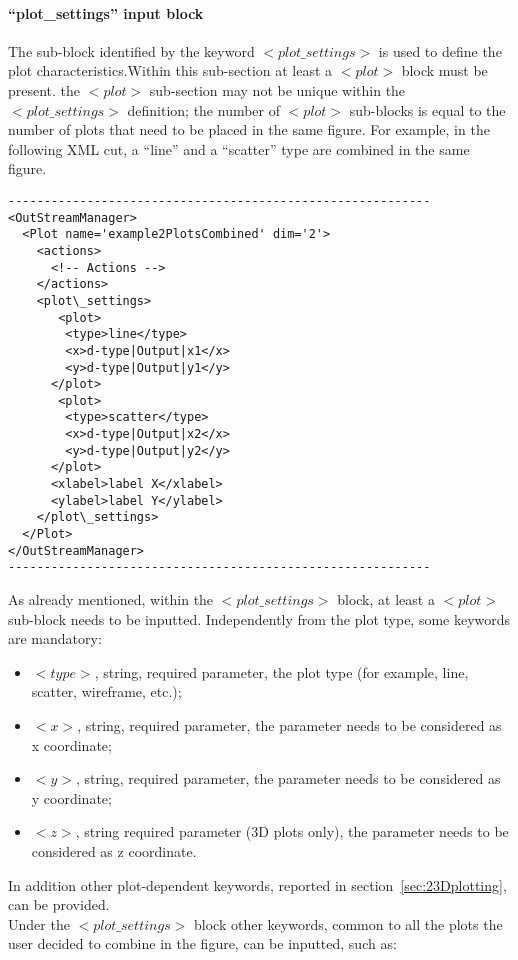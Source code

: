 \paragraph{``plot\_settings'' input block \label{sec:plotSettings}} 
The sub-block identified by the keyword $<plot\_settings>$ is used to define the plot characteristics.Within this sub-section at least a $<plot>$ block must be present. the $<plot>$ sub-section may not be unique within the $<plot\_settings>$  definition; the number of  $<plot>$ sub-blocks is equal to the number of plots that need to be placed in the same figure. For example, in the following XML cut, a ``line'' and a ``scatter'' type are combined in the same figure. 
\begin{lstlisting}[style=XML]
-----------------------------------------------------------
<OutStreamManager>
  <Plot name='example2PlotsCombined' dim='2'>
    <actions>
      <!-- Actions -->
    </actions>
    <plot\_settings>
       <plot>
        <type>line</type>
        <x>d-type|Output|x1</x>
        <y>d-type|Output|y1</y> 
      </plot>
       <plot>
        <type>scatter</type>
        <x>d-type|Output|x2</x>
        <y>d-type|Output|y2</y> 
      </plot>
      <xlabel>label X</xlabel>
      <ylabel>label Y</ylabel>
    </plot\_settings>
  </Plot>
</OutStreamManager>
-----------------------------------------------------------
\end{lstlisting}
As already mentioned, within the $<plot\_settings>$  block, at least a $<plot>$ sub-block needs to be inputted. Independently from the plot type, some keywords are mandatory:
\begin{itemize}
     \item \textit{$<type>$}, string, required parameter, the plot type (for example, line, scatter, wireframe, etc.);
     \item \textit{$<x>$}, string, required parameter, the parameter needs to be considered as x coordinate;
     \item \textit{$<y>$}, string, required parameter, the parameter needs to be considered as y coordinate;
     \item \textit{$<z>$}, string required parameter (3D plots only), the parameter needs to be considered as z coordinate.
\end{itemize}
In addition other plot-dependent keywords, reported in section~\ref{sec:23Dplotting}, can be provided. 
\\Under the  $<plot\_settings>$ block other keywords, common to all the plots the user decided to combine in the figure, can be inputted, such as:
